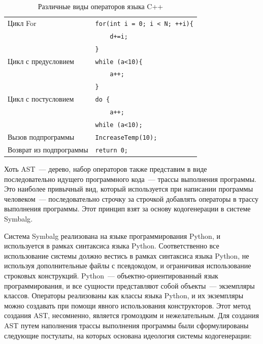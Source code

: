 \begin{table}
\begin{center}
\begin{tabular}{|l|l|}
            Цикл For & \verb"for(int i = 0; i < N; ++i){" \\
                     & \verb"    d+=i;" \\
                     & \verb"}" \\
            \hline
            Цикл с предусловием & \verb"while (a<10){" \\
                                & \verb"    a++;" \\
                                & \verb"}" \\
            \hline
            Цикл с постусловием & \verb"do {" \\
                                & \verb"    a++;" \\
                                & \verb"while (a<10);" \\
            \hline
            Вызов подпрограммы & \verb"IncreaseTemp(10);" \\
            \hline
            Возврат из подпрограммы & \verb"return 0;"\\
            \hline
        \end{tabular}
    \end{center}
    \caption{Различные виды операторов языка {\sf C++}}
    \label{tab:stms}
\end{table}

Хоть AST~--- дерево, набор операторов также представим в виде последовательно идущего программного кода~--- трассы выполнения программы. Это наиболее привычный вид, который используется при написании программы человеком~--- последовательно строчку за строчкой добавлять операторы в трассу выполнения программы. Этот принцип взят за основу кодогенерации в системе {\sf Symbalg}. 

Система {\sf Symbalg} реализована на языке программирования {\sf Python}, и используется в рамках синтаксиса языка {\sf Python}. Соответственно все использование системы должно вестись в рамках синтаксиса языка {\sf Python}, не используя дополнительные файлы с псевдокодом, и ограничивая использование строковых конструкций. {\sf Python}~--- объектно-ориентированный язык программирования, и все сущности представляют собой объекты~--- экземпляры классов. Операторы реализованы как классы языка {\sf Python}, и их экземпляры можно создавать при помощи явного использования конструкторов. Этот метод создания AST, несомненно, является громоздким и нежелательным. Для создания AST путем наполнения трассы выполнения программы были сформулированы следующие постулаты, на которых основана идеология системы кодогенерации:


